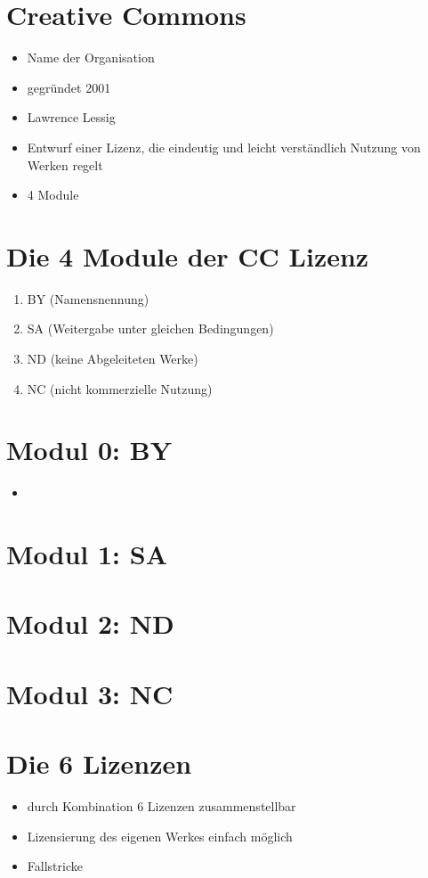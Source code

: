 \documentclass{beamer}
\begin{document}
\section{Creative Commons}
\begin{itemize}
    \item<2-> Name der Organisation
    \item<3-> gegründet 2001
    \item<4-> Lawrence Lessig
    \item<5-> Entwurf einer Lizenz, die eindeutig und leicht verständlich Nutzung von Werken regelt
    \item<6-> 4 Module
\end{itemize}
\section{Die 4 Module der CC Lizenz}
\begin{enumerate}
    \item<2-> BY (Namensnennung)
    \item<3-> SA (Weitergabe unter gleichen Bedingungen)
    \item<4-> ND (keine Abgeleiteten Werke)
    \item<5-> NC (nicht kommerzielle Nutzung)
\end{enumerate}
\section{Modul 0: BY}
\begin{itemize}
    \item 
\end{itemize}
\section{Modul 1: SA}
\section{Modul 2: ND}
\section{Modul 3: NC}
\section{Die 6 Lizenzen}
\begin{itemize}
    \item<2-> durch Kombination 6 Lizenzen zusammenstellbar
    \item<3-> Lizensierung des eigenen Werkes einfach möglich
    \item<4-> Fallstricke
\end{itemize}
\end{document}
